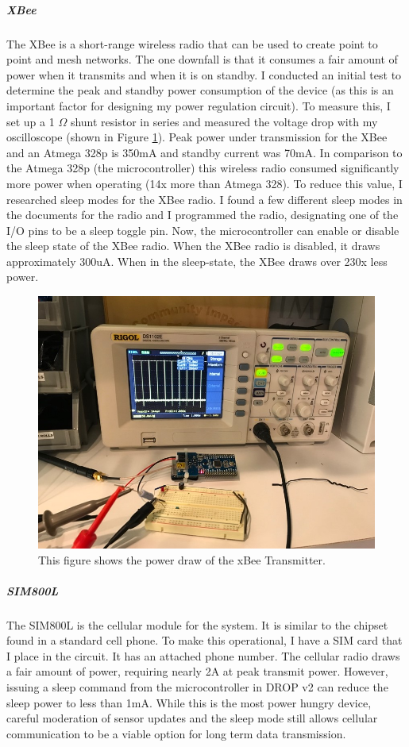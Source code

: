 \documentclass[letter]{article}
\begin{document}
\subparagraph{XBee} The XBee is a short-range wireless radio that can be used to create point to point and mesh networks. The one downfall is that it consumes a fair amount of power when it transmits and when it is on standby. I conducted an initial test to determine the peak and standby power consumption of the device (as this is an important factor for designing my power regulation circuit). To measure this, I set up a 1 $\Omega$ shunt resistor in series and measured the voltage drop with my oscilloscope (shown in Figure \ref{fig:powerDraw}). Peak power under transmission for the XBee and an Atmega 328p is 350mA and standby current was 70mA. In comparison to the Atmega 328p (the microcontroller) this wireless radio consumed significantly more power when operating (14x more than Atmega 328). To reduce this value, I researched sleep modes for the XBee radio. I found a few different sleep modes in the documents for the radio and I programmed the radio, designating one of the I/O pins to be a sleep toggle pin. Now, the microcontroller can enable or disable the sleep state of the XBee radio. When the XBee radio is disabled, it draws approximately 300uA. When in the sleep-state, the XBee draws over 230x less power. 

\begin{figure}[ht]
	\centering
	\includegraphics[width=.5\textwidth]{img/powerDraw.jpg}
	\caption{\label{fig:powerDraw} This figure shows the power draw of the xBee Transmitter.}
\end{figure}

\subparagraph{SIM800L} The SIM800L is the cellular module for the system. It is similar to the chipset found in a standard cell phone. To make this operational, I have a SIM card that I place in the circuit. It has an attached phone number. The cellular radio draws a fair amount of power, requiring nearly 2A at peak transmit power. However, issuing a sleep command from the microcontroller in DROP v2 can reduce the sleep power to less than 1mA. While this is the most power hungry device, careful moderation of sensor updates and the sleep mode still allows cellular communication to be a viable option for long term data transmission.  
\end{document}
